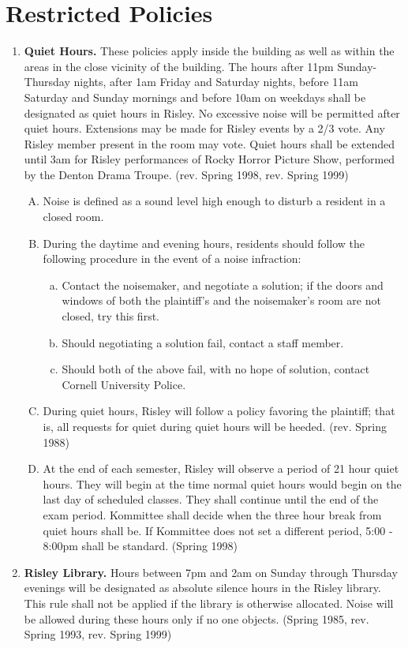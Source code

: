\documentclass[12pt]{article}
\begin{document}
\section*{Restricted Policies}
\begin{enumerate}[1.]
\item \textbf{Quiet Hours.} These policies apply inside the building as well as within the areas in the close vicinity of the building. The hours after 11pm Sunday-Thursday nights, after 1am Friday and Saturday nights, before 11am Saturday and Sunday mornings and before 10am on weekdays shall be designated as quiet hours in Risley. No excessive noise will be permitted after quiet hours. Extensions may be made for Risley events by a 2/3 vote. Any Risley member present in the room may vote. Quiet hours shall be extended until 3am for Risley performances of Rocky Horror Picture Show, performed by the Denton Drama Troupe. (rev. Spring 1998, rev. Spring 1999) 
\begin{enumerate}[A.]
\item Noise is defined as a sound level high enough to disturb a resident in a closed room.
\item During the daytime and evening hours, residents should follow the following procedure in the event of a noise infraction:
\begin{enumerate}[a.]
\item Contact the noisemaker, and negotiate a solution; if the doors and windows of both the plaintiff's and the noisemaker's room are not closed, try this first.
\item Should negotiating a solution fail, contact a staff member. 
\item Should both of the above fail, with no hope of solution, contact Cornell University Police.
\end{enumerate}
\item During quiet hours, Risley will follow a policy favoring the plaintiff; that is, all requests for quiet during quiet hours will be heeded. (rev. Spring 1988) 
\item At the end of each semester, Risley will observe a period of 21 hour quiet hours. They will begin at the time normal quiet hours would begin on the last day of scheduled classes. They shall continue until the end of the exam period. Kommittee shall decide when the three hour break from quiet hours shall be. If Kommittee does not set a different period, 5:00 - 8:00pm shall be standard. (Spring 1998)
\end{enumerate}
\item \textbf{Risley Library.} Hours between 7pm and 2am on Sunday through Thursday evenings will be designated as absolute silence hours in the Risley library. This rule shall not be applied if the library is otherwise allocated. Noise will be allowed during these hours only if no one objects. (Spring 1985, rev. Spring 1993, rev. Spring 1999)

\end{enumerate}
\end{document}
